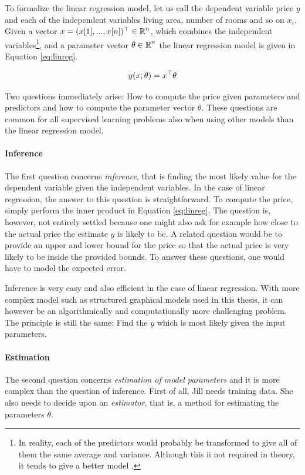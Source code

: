 To formalize the linear regression model, let us call the dependent
variable price $y$ and each of the independent variables living area,
number of rooms and so on $x_i$. Given a vector $x = (x[1], ...,
x[n])^\top \in \mbox{$\mathbb R$}^n$, which combines the independent
variables\footnote{In reality, each of the predictors would probably
  be transformed to give all of them the same average and
  variance. Although this ii not required in theory, it tends to give
  a better model \cite{someone}.}, and a parameter vector $\theta \in
\mbox{$\mathbb R$}^n$ the linear regression model is given in Equation
\ref{eq:linreg}.

\begin{equation}
y(x\mbox{$ ; \, $} \theta) = x^\top\theta\label{eq:linreg}
\end{equation}

Two questions immediately arise: How to compute the price given
parameters and predictors and how to compute the parameter vector
$\theta$. These questions are common for all supervised learning
problems also when using other models than the linear regression
model.

\paragraph{Inference} The first question concerns {\it inference},
that is finding the most likely value for the dependent variable given
the independent variables. In the case of linear regression, the
answer to this question is straightforward. To compute the price,
simply perform the inner product in Equation \ref{eq:linreg}. The
question is, however, not entirely settled because one might also ask
for example how close to the actual price the estimate $y$ is likely
to be. A related question would be to provide an upper and lower bound
for the price so that the actual price is very likely to be inside the
provided bounds. To answer these questions, one would have to model
the expected error.

Inference is very easy and also efficient in the case of linear
regression. With more complex model such as structured graphical
models used in this thesis, it can however be an algorithmically and
computationally more challenging problem. The principle is still the
same: Find the $y$ which is most likely given the input parameters.

\paragraph{Estimation} The second question concerns {\it estimation of
  model parameters} and it is more complex than the question of
inference. First of all, Jill needs training data. She also needs to
decide upon an {\it estimator}, that is, a method for estimating the
parameters $\theta$.

